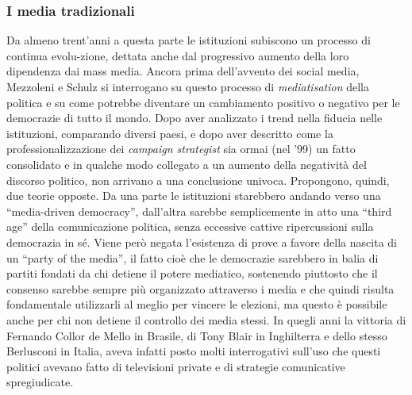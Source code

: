 \subsubsection{I media tradizionali}
Da almeno trent'anni a questa parte le istituzioni subiscono un processo di continua evolu-zione, dettata anche dal progressivo aumento della loro dipendenza dai mass media. Ancora prima dell'avvento dei social media, Mezzoleni e Schulz si interrogano su questo processo di \textit{mediatisation} della politica \citep{mazzoleni1999} e su come potrebbe diventare un cambiamento positivo o negativo per le democrazie di tutto il mondo. Dopo aver analizzato i trend nella fiducia nelle istituzioni, comparando diversi paesi, e dopo aver descritto come la professionalizzazione dei \textit{campaign strategist} sia ormai (nel '99) un fatto consolidato e in qualche modo collegato a un aumento della negatività del discorso politico, non arrivano a una conclusione univoca. Propongono, quindi, due teorie opposte. Da una parte le istituzioni starebbero andando verso una “media-driven democracy”, dall'altra sarebbe semplicemente in atto una “third age” della comunicazione politica, senza eccessive cattive ripercussioni sulla democrazia in sé. Viene però negata l'esistenza di prove a favore della nascita di un “party of the media”, il fatto cioè che le democrazie sarebbero in balia di partiti fondati da chi detiene il potere mediatico, sostenendo piuttosto che il consenso sarebbe sempre più organizzato attraverso i media e che quindi risulta fondamentale utilizzarli al meglio per vincere le elezioni, ma questo è possibile anche per chi non detiene il controllo dei media stessi. In quegli anni la vittoria di Fernando Collor de  Mello in Brasile, di Tony  Blair in Inghilterra e dello stesso Berlusconi in Italia, aveva infatti posto molti interrogativi sull'uso che questi politici avevano fatto di televisioni private e di strategie comunicative spregiudicate.

